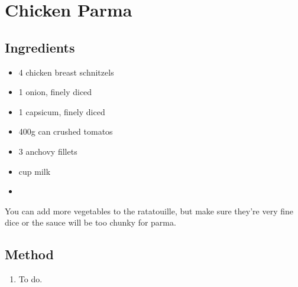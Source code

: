 \clearpage
\section{Chicken Parma}


  \subsection{Ingredients}
    
  \begin{itemize}
    \item 4 chicken breast schnitzels
    \item 1 onion, finely diced
    \item 1 capsicum, finely diced
    \item 400g can crushed tomatos
    \item 3 anchovy fillets
    \item {} cup milk
    \item 
  \end{itemize}

  You can add more vegetables to the ratatouille, but make sure they're very fine dice or the sauce will be too chunky for parma.

  \subsection{Method}

  \begin{enumerate}
    \item To do.
  \end{enumerate}
